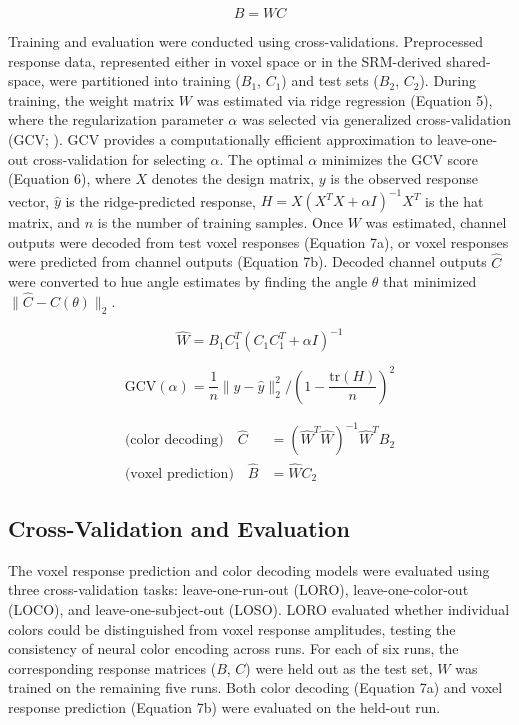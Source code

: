 \begin{equation}
B = W C
\end{equation}

Training and evaluation were conducted using cross-validations. Preprocessed response data, represented either in voxel space or in the SRM-derived shared-space, were partitioned into training ($B_1$, $C_1$) and test sets ($B_2$, $C_2$). During training, the weight matrix $W$ was estimated via ridge regression (Equation 5), where the regularization parameter $\alpha$ was selected via generalized cross-validation (GCV; \cite{golub1979}). GCV provides a computationally efficient approximation to leave-one-out cross-validation for selecting $\alpha$. The optimal $\alpha$ minimizes the GCV score (Equation 6), where $X$ denotes the design matrix, $y$ is the observed response vector, $\hat{y}$ is the ridge-predicted response, $H = X(X^T X + \alpha I)^{-1}X^T$ is the hat matrix, and $n$ is the number of training samples. Once $W$ was estimated, channel outputs were decoded from test voxel responses (Equation 7a), or voxel responses were predicted from channel outputs (Equation 7b). Decoded channel outputs $\hat{C}$ were converted to hue angle estimates by finding the angle $\theta$ that minimized $\|\hat{C} - C(\theta)\|_2$.

\begin{equation}
\hat{W} = B_1 C_1^T (C_1 C_1^T + \alpha I)^{-1}
\end{equation}

\begin{equation}
\text{GCV}(\alpha) = \frac{1}{n} \|y - \hat{y}\|_2^2 / \left(1 - \frac{\text{tr}(H)}{n}\right)^2
\end{equation}

\begin{align}
\text{(color decoding)} \quad \hat{C} &= (\hat{W}^T \hat{W})^{-1} \hat{W}^T B_2 \\
\text{(voxel prediction)} \quad \hat{B} &= \hat{W} C_2
\end{align}

\subsection*{Cross-Validation and Evaluation}

The voxel response prediction and color decoding models were evaluated using three cross-validation tasks: leave-one-run-out (LORO), leave-one-color-out (LOCO), and leave-one-subject-out (LOSO). LORO evaluated whether individual colors could be distinguished from voxel response amplitudes, testing the consistency of neural color encoding across runs. For each of six runs, the corresponding response matrices ($B$, $C$) were held out as the test set, $W$ was trained on the remaining five runs. Both color decoding (Equation 7a) and voxel response prediction (Equation 7b) were evaluated on the held-out run.

